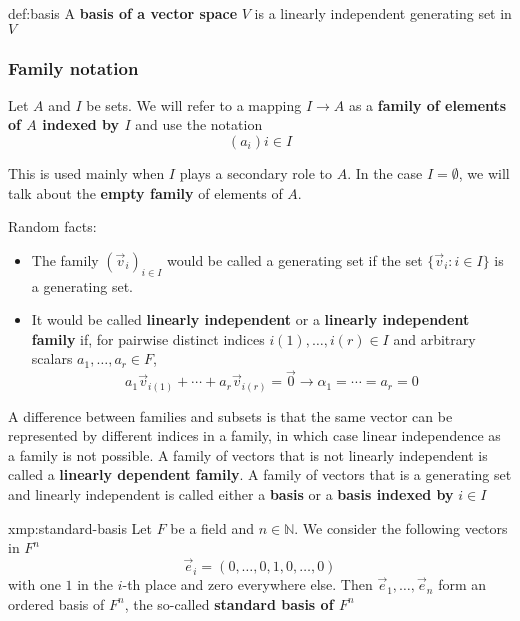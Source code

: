 \documentclass{article}
\begin{document}
\begin{dfn}{def:basis}{}
    A \textbf{basis of a vector space} $V$ is a linearly independent generating set in $V$
\end{dfn}

\subsubsection{Family notation}
Let $A$ and $I$ be sets. We will refer to a mapping $I\to A$ as a \textbf{family of elements of $A$ indexed by $I$} and use the notation
\[(a_{i})i\in I\]

This is used mainly when $I$ plays a secondary role to $A$. In the case $I = \emptyset$, we will talk about the \textbf{empty family} of elements of $A$.

Random facts:
\begin{itemize}
    \item The family $(\vec{v}_{i})_{i\in I}$ would be called a generating set if the set $\{\vec{v}_{i} : i\in I\}$ is a generating set.
    \item It would be called \textbf{linearly independent} or a \textbf{linearly independent family} if, for pairwise distinct indices $i(1),\dots,i(r)\in I$ and arbitrary scalars $a_{1},\dots,a_{r}\in F$,
        \[a_{1}\vec{v}_{i(1)} + \cdots + a_{r}\vec{v}_{i(r)} = \vec{0} \to \alpha_{1} = \cdots = a_{r} = 0\]
\end{itemize}

A difference between families and subsets is that the same vector can be represented by different indices in a family, in which case linear independence as a family is not possible. A family of vectors that is not linearly independent is called a \textbf{linearly dependent family}. A family of vectors that is a generating set and linearly independent is called either a \textbf{basis} or a \textbf{basis indexed by} $i\in I$

\begin{xmp}{xmp:standard-basis}{}
    Let $F$ be a field and $n\in \mathbb{N}$. We consider the following vectors in $F^{n}$
    \[\vec{e}_{i} = (0,\dots,0,1,0,\dots,0)\]
    with one $1$ in the $i$-th place and zero everywhere else. Then $\vec{e}_{1} ,\dots, \vec{e}_{n}$ form an ordered basis of $F^{n}$, the so-called \textbf{standard basis of $F^{n}$}
\end{xmp}
\end{document}
